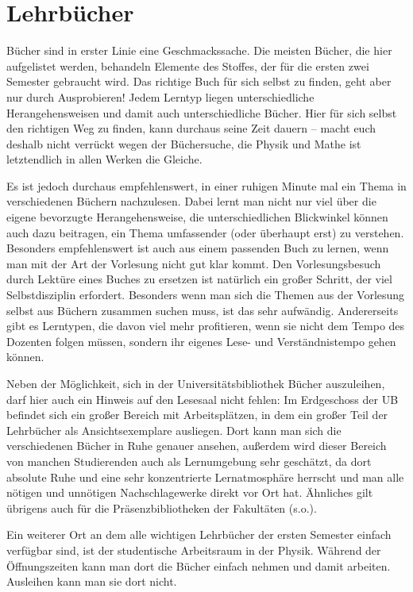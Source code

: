 \section{Lehrbücher}

Bücher sind in erster Linie eine Geschmackssache. Die meisten Bücher, die
hier aufgelistet werden, behandeln Elemente des Stoffes, der für die ersten
zwei Semester gebraucht wird. Das richtige Buch für sich selbst zu finden,
geht aber nur durch Ausprobieren! Jedem Lerntyp liegen unterschiedliche
Herangehensweisen und damit auch unterschiedliche Bücher. Hier für sich
selbst den richtigen Weg zu finden, kann durchaus seine Zeit dauern -- macht
euch deshalb nicht verrückt wegen der Büchersuche, die Physik und Mathe ist
letztendlich in allen Werken die Gleiche.

Es ist jedoch durchaus empfehlenswert, in einer ruhigen Minute mal ein Thema
in verschiedenen Büchern nachzulesen. Dabei lernt man nicht nur viel über die
eigene bevorzugte Herangehensweise, die unterschiedlichen Blickwinkel können
auch dazu beitragen, ein Thema umfassender (oder überhaupt erst) zu verstehen.
Besonders empfehlenswert ist auch aus einem passenden Buch zu lernen, wenn man 
mit der Art der Vorlesung nicht gut klar kommt. Den Vorlesungsbesuch durch 
Lektüre eines Buches zu ersetzen ist natürlich ein großer Schritt, der viel 
Selbstdisziplin erfordert. Besonders wenn man sich die Themen aus der Vorlesung
selbst aus Büchern zusammen suchen muss, ist das sehr aufwändig. Andererseits
gibt es Lerntypen, die davon viel mehr profitieren, wenn sie nicht dem Tempo
des Dozenten folgen müssen, sondern ihr eigenes Lese- und Verständnistempo gehen
können.

Neben der Möglichkeit, sich in der Universitätsbibliothek Bücher auszuleihen,
darf hier auch ein Hinweis auf den Lesesaal nicht fehlen: Im Erdgeschoss der UB
befindet sich ein großer Bereich mit Arbeitsplätzen, in dem ein großer Teil der
Lehrbücher als Ansichtsexemplare ausliegen.  Dort kann man sich die
verschiedenen Bücher in Ruhe genauer ansehen, außerdem wird dieser Bereich von
manchen Studierenden auch als Lernumgebung sehr geschätzt, da dort absolute
Ruhe und eine sehr konzentrierte Lernatmosphäre herrscht und man alle nötigen
und unnötigen Nachschlagewerke direkt vor Ort hat. Ähnliches gilt übrigens auch
für die Präsenzbibliotheken der Fakultäten (s.o.).

Ein weiterer Ort an dem alle wichtigen Lehrbücher der ersten Semester einfach verfügbar
sind, ist der studentische Arbeitsraum in der Physik. Während der Öffnungszeiten kann
man dort die Bücher einfach nehmen und damit arbeiten. Ausleihen kann man sie dort nicht.

